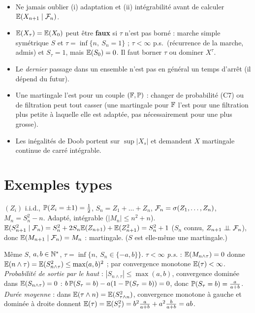 \documentclass[11pt,a4paper]{article}
\begin{document}
\begin{piege}
\begin{itemize}
  \item Ne jamais oublier (i) adaptation et (ii) intégrabilité avant de calculer $\mathbb{E}(X_{n+1}\mid\mathcal{F}_n)$.
  \item $\mathbb{E}(X_\tau)=\mathbb{E}(X_0)$ peut être \textbf{faux} si $\tau$ n'est pas borné : marche simple symétrique $S$ et
  $\tau=\inf\{n,\ S_n=1\}$ ; $\tau<\infty$ p.s.\ (récurrence de la marche, admis) et $S_\tau=1$, mais $\mathbb{E}(S_0)=0$. Il faut borner $\tau$ ou dominer $X^\tau$.
  \item Le \emph{dernier} passage dans un ensemble n'est pas en général un temps d'arrêt (il dépend du futur).
  \item Une martingale l'est pour un couple $(\mathbb{F},\mathbb{P})$ : changer de probabilité (C7) ou de filtration peut tout casser
  (une martingale pour $\mathbb{F}$ l'est pour une filtration plus petite à laquelle elle est adaptée, pas nécessairement pour une plus grosse).
  \item Les inégalités de Doob portent sur $\sup|X_s|$ et demandent $X$ martingale continue de carré intégrable.
\end{itemize}
\end{piege}

\section*{Exemples types}

\begin{exemple}\label{C8:ex-quad}
$(Z_i)$ i.i.d., $\mathbb{P}(Z_i=\pm1)=\frac12$, $S_n=Z_1+\dots+Z_n$, $\mathcal{F}_n=\sigma(Z_1,\dots,Z_n)$, $M_n=S_n^2-n$.
Adapté, intégrable ($|M_n|\le n^2+n$). $\mathbb{E}(S_{n+1}^2\mid\mathcal{F}_n)=S_n^2+2S_n\mathbb{E}(Z_{n+1})+\mathbb{E}(Z_{n+1}^2)=S_n^2+1$
($S_n$ connu, $Z_{n+1}\perp\!\!\!\perp\mathcal{F}_n$), donc $\mathbb{E}(M_{n+1}\mid\mathcal{F}_n)=M_n$ : martingale. ($S$ est elle-même une martingale.)
\end{exemple}

\begin{exemple}\label{C8:ex-sortie}
Même $S$, $a,b\in\mathbb{N}^*$, $\tau=\inf\{n,\ S_n\in\{-a,b\}\}$.
\emph{$\tau<\infty$ p.s.} : $\mathbb{E}(M_{n\wedge\tau})=0$ donne $\mathbb{E}(n\wedge\tau)=\mathbb{E}(S_{n\wedge\tau}^2)\le\max(a,b)^2$ ; par convergence monotone
$\mathbb{E}(\tau)<\infty$.
\emph{Probabilité de sortie par le haut} : $|S_{n\wedge\tau}|\le\max(a,b)$, convergence dominée dans $\mathbb{E}(S_{n\wedge\tau})=0$ :
$b\,\mathbb{P}(S_\tau=b)-a(1-\mathbb{P}(S_\tau=b))=0$, donc $\mathbb{P}(S_\tau=b)=\frac a{a+b}$.
\emph{Durée moyenne} : dans $\mathbb{E}(\tau\wedge n)=\mathbb{E}(S_{\tau\wedge n}^2)$, convergence monotone à gauche et dominée à droite donnent $\mathbb{E}(\tau)=\mathbb{E}(S_\tau^2)=b^2\frac a{a+b}+a^2\frac b{a+b}=ab$.
\end{exemple}
\end{document}
